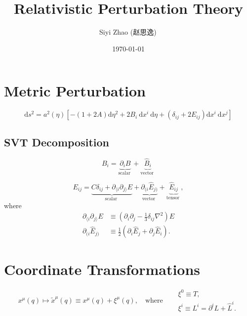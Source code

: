 \documentclass{ctexart}
\begin{document}
\title{Relativistic Perturbation Theory}
\author{Siyi Zhao (赵思逸)\,}
\date{\today}

\maketitle
\tableofcontents

\section{Metric Perturbation}

\begin{equation}
    \mathrm{d} s^2=a^2(\eta)\left[-(1+2 A) \mathrm{d} \eta^2+2 B_i \mathrm{~d} x^i \mathrm{~d} \eta+\left(\delta_{i j}+2 E_{i j}\right) \mathrm{d} x^i \mathrm{~d} x^j\right]
\end{equation}

\subsection{SVT Decomposition}

\begin{equation}
    B_i=\underbrace{\partial_i B}_{\text {scalar }}+\underbrace{\hat{B}_i}_{\text {vector }}
\end{equation}

\begin{equation}
    E_{i j}=\underbrace{C \delta_{i j}+\partial_{\langle i} \partial_{j\rangle} E}_{\text {scalar }}+\underbrace{\partial_{(i} \hat{E}_{j)}}_{\text {vector }}+\underbrace{\hat{E}_{i j}}_{\text {tensor }},
\end{equation}
where   
\begin{equation}
    \begin{aligned}
    \partial_{\langle i} \partial_{j\rangle} E & \equiv\left(\partial_i \partial_j-\frac{1}{3} \delta_{i j} \nabla^2\right) E \\
    \partial_{(i} \hat{E}_{j)} & \equiv \frac{1}{2}\left(\partial_i \hat{E}_j+\partial_j \hat{E}_i\right) .
    \end{aligned}
\end{equation}

\section{Coordinate Transformations}

\begin{equation}
    x^\mu(q) \mapsto \tilde{x}^\mu(q) \equiv x^\mu(q)+\xi^\mu(q), \quad 
    \text{where} \quad 
    \begin{aligned}
        & \xi^0 \equiv T, \\
        & \xi^i \equiv L^i=\partial^i L+\hat{L}^i.
    \end{aligned}
\end{equation}
\end{document}
